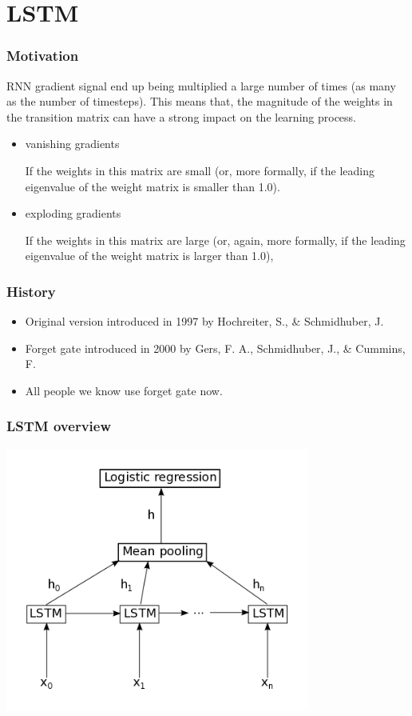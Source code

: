 \documentclass[utf8x,xcolor=pdftex,dvipsnames,table]{beamer}
\begin{document}
\section{LSTM}
\begin{frame}
  \tableofcontents[currentsection]
\end{frame}

\begin{frame}
  \frametitle{Motivation}
RNN gradient signal end up being multiplied a large number of times (as many as the number of timesteps).
This means that, the magnitude of the weights in the transition matrix can have a strong impact on the learning process.
\begin{itemize}
\item \begin{bf}vanishing gradients\end{bf}
 If the weights in this matrix are small (or, more formally, if the leading eigenvalue of the weight matrix is smaller than 1.0).
\item \begin{bf}exploding gradients\end{bf} If the weights in this matrix are large (or, again, more formally, if the leading eigenvalue of the weight matrix is larger than 1.0),
\end{itemize}
\end{frame}

\begin{frame}
  \frametitle{History}
\begin{itemize}
\item Original version introduced in 1997 by Hochreiter, S., \& Schmidhuber, J.
\item Forget gate introduced in 2000 by Gers, F. A., Schmidhuber, J., \& Cummins, F.
\item All people we know use forget gate now.
\end{itemize}
\end{frame}

\begin{frame}
  \frametitle{LSTM overview}
\includegraphics[width=0.75\textwidth]{../images/lstm.png}
\end{frame}
\end{document}

